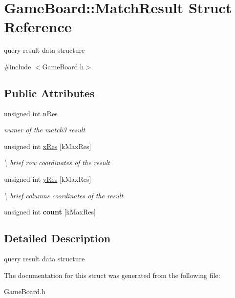 \hypertarget{struct_game_board_1_1_match_result}{\section{Game\-Board\-:\-:Match\-Result Struct Reference}
\label{struct_game_board_1_1_match_result}
}


query result data structure  




{\ttfamily \#include $<$Game\-Board.\-h$>$}

\subsection*{Public Attributes}
\begin{DoxyCompactItemize}
\item 
\hypertarget{struct_game_board_1_1_match_result_a1ca2fd2f87c83fba90c750e755273ce9}{unsigned int \hyperlink{struct_game_board_1_1_match_result_a1ca2fd2f87c83fba90c750e755273ce9}{n\-Res}}\label{struct_game_board_1_1_match_result_a1ca2fd2f87c83fba90c750e755273ce9}

\begin{DoxyCompactList}\small\item\em numer of the match3 result \end{DoxyCompactList}\item 
\hypertarget{struct_game_board_1_1_match_result_a5e070a8f12242add45218a1fec06b2b9}{unsigned int \hyperlink{struct_game_board_1_1_match_result_a5e070a8f12242add45218a1fec06b2b9}{x\-Res} \mbox{[}k\-Max\-Res\mbox{]}}\label{struct_game_board_1_1_match_result_a5e070a8f12242add45218a1fec06b2b9}

\begin{DoxyCompactList}\small\item\em \textbackslash{} brief row coordinates of the result \end{DoxyCompactList}\item 
\hypertarget{struct_game_board_1_1_match_result_abf72e679efa16ddb7918de5eddd449ca}{unsigned int \hyperlink{struct_game_board_1_1_match_result_abf72e679efa16ddb7918de5eddd449ca}{y\-Res} \mbox{[}k\-Max\-Res\mbox{]}}\label{struct_game_board_1_1_match_result_abf72e679efa16ddb7918de5eddd449ca}

\begin{DoxyCompactList}\small\item\em \textbackslash{} brief columns coordinates of the result \end{DoxyCompactList}\item 
\hypertarget{struct_game_board_1_1_match_result_a1edac7bbd8c9451e01bec72f6ae09a84}{unsigned int {\bfseries count} \mbox{[}k\-Max\-Res\mbox{]}}\label{struct_game_board_1_1_match_result_a1edac7bbd8c9451e01bec72f6ae09a84}

\end{DoxyCompactItemize}


\subsection{Detailed Description}
query result data structure 

The documentation for this struct was generated from the following file\-:\begin{DoxyCompactItemize}
\item 
Game\-Board.\-h\end{DoxyCompactItemize}

